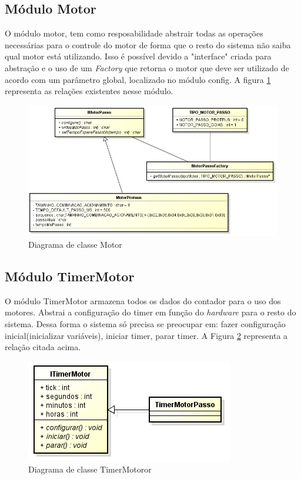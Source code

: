 \subsection{Módulo Motor}

O módulo motor, tem como resposabilidade abstrair todas as operações necessárias para o controle do motor de forma que o resto do sistema não saiba qual motor está utilizando. Isso é possível devido a "interface" criada para abstração e o uso de um \emph{Factory} que retorna o motor que deve ser utilizado de acordo com um parâmetro global, localizado no módulo config. A figura \ref{fig:classemotor} representa as relações existentes nesse módulo. \newpage


\begin{figure}[htp]
	\centering
	\includegraphics[scale=0.8]{images/classe_motor.png}
	\caption{Diagrama de classe Motor}	
	\label{fig:classemotor}
\end{figure}

\subsection{Módulo TimerMotor}

O módulo TimerMotor armazena todos os dados do contador para o uso dos motores. Abstrai a configuração do timer em função do \emph{hardware} para o resto do sistema. Dessa forma o sistema só precisa se preocupar em: fazer configuração inicial(inicializar variáveis), iniciar timer, parar timer. A Figura \ref{fig:classe_timer_motor} representa a relação citada acima.

\begin{figure}[htp]
	\centering
	\includegraphics[scale=1]{images/classe_timer_motor.png}
	\caption{Diagrama de classe TimerMotoror}	
	\label{fig:classe_timer_motor}
\end{figure}


